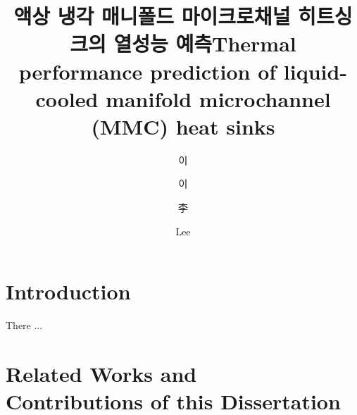 \documentclass[master,english,draft,pdfdoc]{kaist-ucs}
\title[korean] {액상 냉각 매니폴드 마이크로채널 히트싱크의 열성능 예측}
\title[english]{Thermal performance prediction of liquid-cooled manifold microchannel (MMC) heat sinks}
\author[korean] {이}{한 솔}
\author[korean2] {이}{한솔}    %
\author[chinese]{李}{한 솔}
\author[english]{Lee}{Hansol}
\begin{document}

   \thesisinfo
    \begin{summary}      


    \end{summary}
   
    \begin{Korkeyword}

    \end{Korkeyword}


    \begin{abstract}

    \end{abstract} 
     
    \begin{Engkeyword}

    \end{Engkeyword}
   

    \addtocounter{pagemarker}{1}                 %
    \newpage 
  


    \tableofcontents

    \listoftables

    \listoffigures



\chapter{Introduction}
\noindent
There ...

\chapter[Related Works and Contributions of this Dissertation]{Related Works and \\ Contributions of this Dissertation}
\end{document}
